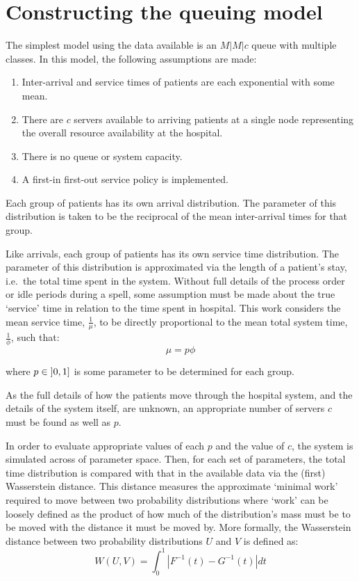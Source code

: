 \section{Constructing the queuing model}\label{sec:wasserstein}

The simplest model using the data available is an \(M|M|c\) queue with multiple
classes. In this model, the following assumptions are made:
\begin{enumerate}
    \item Inter-arrival and service times of patients are each exponential with
        some mean.
    \item There are $c$ servers available to arriving patients at a single node
        representing the overall resource availability at the hospital.
    \item There is no queue or system capacity.
    \item A first-in first-out service policy is implemented.
\end{enumerate}

Each group of patients has its own arrival distribution. The parameter of this
distribution is taken to be the reciprocal of the mean inter-arrival times for
that group.

Like arrivals, each group of patients has its own service time distribution.
The parameter of this distribution is approximated via the length of a patient's
stay, i.e.\ the total time spent in the system. Without full details of the
process order or idle periods during a spell, some assumption must be made about
the true `service' time in relation to the time spent in hospital. This work
considers the mean service time, \(\frac{1}{\mu}\), to be directly proportional
to the mean total system time, \(\frac{1}{\phi}\), such that:
\begin{equation}
    \mu = p \phi
\end{equation}

\noindent where \(p \in \interval[open left]{0}{1}\) is some parameter to be
determined for each group.

As the full details of how the patients move through the hospital system, and
the details of the system itself, are unknown, an appropriate number of servers
\(c\) must be found as well as \(p\).

In order to evaluate appropriate values of each \(p\) and the value of \(c\),
the system is simulated across of parameter space. Then, for each set of
parameters, the total time distribution is compared with that in the available
data via the (first) Wasserstein distance. This distance measures the
approximate `minimal work' required to move between two probability
distributions where `work' can be loosely defined as the product of how much of
the distribution's mass must be to be moved with the distance it must be moved
by. More formally, the Wasserstein distance between two probability
distributions \(U\) and \(V\) is defined as:
\begin{equation}\label{eq:wasserstein}
    W(U, V) = \int_{0}^{1} \left\vert F^{-1}(t) - G^{-1}(t) \right\vert dt
\end{equation}

